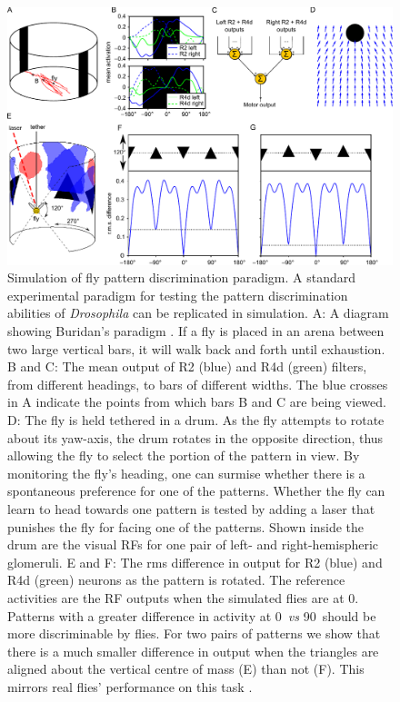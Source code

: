 \begin{figure}
\centering
\includegraphics{figures/recap}
\caption{Simulation of fly pattern discrimination paradigm. A standard experimental paradigm for testing the pattern discrimination abilities of \emph{Drosophila} \protect\cite{Ernst1999} can be replicated in simulation.
A: A diagram showing Buridan's paradigm \protect\cite{Bulthoff1982,Gotz1980}. If a fly is placed in an arena between two large vertical bars, it will walk back and forth until exhaustion.
B and C: The mean output of R2 (blue) and R4d (green) filters, from different headings, to bars of different widths. The blue crosses in A indicate the points from which bars B and C are being viewed.
D: The fly is held tethered in a drum. As the fly attempts to rotate about its yaw-axis, the drum rotates in the opposite direction, thus allowing the fly to select the portion of the pattern in view.
By monitoring the fly's heading, one can surmise whether there is a spontaneous preference for one of the patterns.
Whether the fly can learn to head towards one pattern is tested by adding a laser that punishes the fly for facing one of the patterns.
Shown inside the drum are the visual \acp{RF} for one pair of left- and right-hemispheric glomeruli.
E and F: The \ac{rms} difference in output for R2 (blue) and R4d (green) neurons as the pattern is rotated.
The reference activities are the \ac{RF} outputs when the simulated flies are at 0\degree.
Patterns with a greater difference in activity at 0\degree\ \emph{vs} 90\degree\ should be more discriminable by flies.
For two pairs of patterns we show that there is a much smaller difference in output when the triangles are aligned about the vertical centre of mass (E) than not (F).
This mirrors real flies' performance on this task \protect\cite{Ernst1999}.}
\label{fig:recap}
\end{figure}
